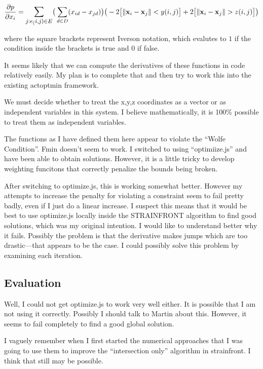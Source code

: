 \documentclass[11pt]{article}
\begin{document}
\begin{multline}
  \frac{\partial p}{\partial x_i}
  =  \mathlarger{\sum_{j:e_(i,j) \in E}}
  \big(\sum_{d \in D}(x_{id} - x_{jd})\big) \big(-2\big[\lVert \mathbf{x}_i - \mathbf{x}_j \rVert < y(i,j)\big]
  + 2\big[\lVert \mathbf{x}_i - \mathbf{x}_j \rVert > z(i,j)\big]\big)
\end{multline}

where the square brackets represent Iverson notation, which evalutes to $1$ if the condition
inside the brackets is true and $0$ if false.

It seems likely that we can compute the derivatives of these functions in code relatively easily.
My plan is to complete that and then try to work this into the existing actoptmin framework.

We must decide whether to treat the x,y,z coordinates as a vector or as independent variables in
this system. I believe mathematically, it is 100\% possible to treat them as independent variables.

The functions as I have defined them here appear to violate the ``Wolfe Condition''. Fmin doesn't seem to work.
I switched to using ``optimiize.js'' and have been able to obtain solutions.  However, it is a little
tricky to develop weighting funcitons that correctly penalize the bounds being broken.

After switching to optimize.js, this is working somewhat better. However my attempts to increase
the penalty for violating a constraint seem to fail pretty badly, even if I just do a linear increase.
I suspect this means that it would be best to use optimize.js locally inside the STRAINFRONT algorithm
to find good solutions, which was my original intention. I would like to understand better why it fails.
Possibly the problem is that the derivative makes jumps which are too drastic---that appears to be
the case. I could possibly solve this problem by examining each iteration.

\subsection{Evaluation}

Well, I could not get optimize.js to work very well either.  It is possible that I am not using it correctly.
Possibly I should talk to Martin about this.  However, it seems to fail completely to find a good global
solution.

I vaguely remember when I first started the numerical approaches that I was going to use them to improve the
``intersection only'' algorithm in strainfront.  I think that still may be possible.
\end{document}
